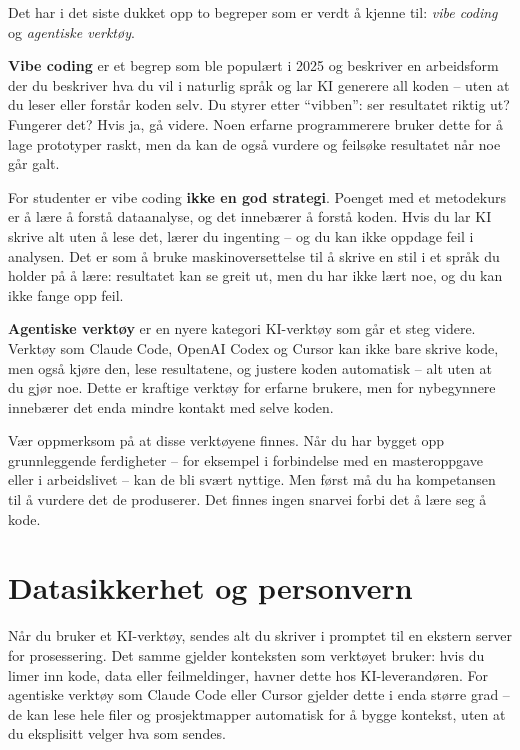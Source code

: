 \documentclass[
  norsk,
  letterpaper,
  DIV=11,
  numbers=noendperiod]{scrreprt}
\theoremstyle{definition}
\theoremstyle{remark}
\begin{document}
Det har i det siste dukket opp to begreper som er verdt å kjenne til:
\emph{vibe coding} og \emph{agentiske verktøy}.

\textbf{Vibe coding} er et begrep som ble populært i 2025 og beskriver
en arbeidsform der du beskriver hva du vil i naturlig språk og lar KI
generere all koden -- uten at du leser eller forstår koden selv. Du
styrer etter ``vibben'': ser resultatet riktig ut? Fungerer det? Hvis
ja, gå videre. Noen erfarne programmerere bruker dette for å lage
prototyper raskt, men da kan de også vurdere og feilsøke resultatet når
noe går galt.

For studenter er vibe coding \textbf{ikke en god strategi}. Poenget med
et metodekurs er å lære å forstå dataanalyse, og det innebærer å forstå
koden. Hvis du lar KI skrive alt uten å lese det, lærer du ingenting --
og du kan ikke oppdage feil i analysen. Det er som å bruke
maskinoversettelse til å skrive en stil i et språk du holder på å lære:
resultatet kan se greit ut, men du har ikke lært noe, og du kan ikke
fange opp feil.

\textbf{Agentiske verktøy} er en nyere kategori KI-verktøy som går et
steg videre. Verktøy som Claude Code, OpenAI Codex og Cursor kan ikke
bare skrive kode, men også kjøre den, lese resultatene, og justere koden
automatisk -- alt uten at du gjør noe. Dette er kraftige verktøy for
erfarne brukere, men for nybegynnere innebærer det enda mindre kontakt
med selve koden.

Vær oppmerksom på at disse verktøyene finnes. Når du har bygget opp
grunnleggende ferdigheter -- for eksempel i forbindelse med en
masteroppgave eller i arbeidslivet -- kan de bli svært nyttige. Men
først må du ha kompetansen til å vurdere det de produserer. Det finnes
ingen snarvei forbi det å lære seg å kode.

\section{Datasikkerhet og personvern}\label{datasikkerhet-og-personvern}

Når du bruker et KI-verktøy, sendes alt du skriver i promptet til en
ekstern server for prosessering. Det samme gjelder konteksten som
verktøyet bruker: hvis du limer inn kode, data eller feilmeldinger,
havner dette hos KI-leverandøren. For agentiske verktøy som Claude Code
eller Cursor gjelder dette i enda større grad -- de kan lese hele filer
og prosjektmapper automatisk for å bygge kontekst, uten at du eksplisitt
velger hva som sendes.
\end{document}
